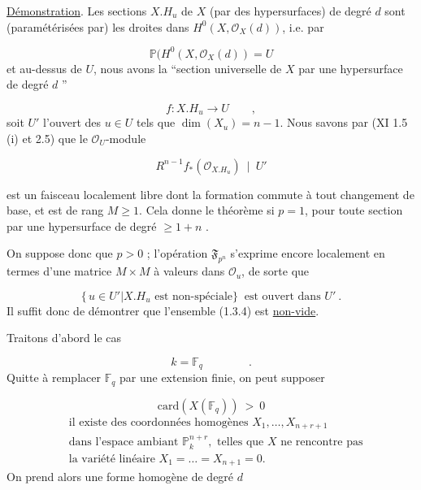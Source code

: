 \underline{Démonstration}. Les sections $X.H_u$ de $X$ (par des hypersurfaces) de degré $d$ sont (paramétérisées par) les droites dans $H^0(X,\mathcal{O}_X(d))$, i.e. par

\begin{equation}\tag{1.3.1}
\mathbb{P}(H^0(X,\mathcal{O}_X(d)) = U
\end{equation}
et au-dessus de $U$, nous avons la ``section universelle de $X$ par une hypersurface de degré $d$ ''

\begin{equation}\tag{1.3.2}
f : X.H_u \longrightarrow U \qquad ,
\end{equation}
soit $U'$ l'ouvert des $u \in U$ tels que $\dim(X_u) = n-1$. Nous savons par (XI 1.5 (i) et 2.5) que le $\mathcal{O}_U$-module

\begin{equation}\tag{1.3.3}
R^{n-1}f_*(\mathcal{O}_{X.H_u}) \ \mid \ U' 
\end{equation}


 est un faisceau localement libre dont la formation commute à tout changement de base, et est de rang $M \geq 1$. Cela donne le théorème si $p = 1$, pour toute section par une hypersurface de degré $\geq 1+n$ .

On suppose donc que $p > 0$ ; l'opération $\mathfrak{F}_{p^n}$ s'exprime encore localement en termes d'une matrice $M \times M$ à valeurs dans $\mathcal{O}_u$, de sorte que

\begin{equation}\tag{1.3.4}
\{ \, u \in U' | X.H_u \text{ est non-spéciale} \} \ \text{ est ouvert dans } U' \ .
\end{equation}
Il suffit donc de démontrer que l'ensemble (1.3.4) est \underline{non-vide}.

Traitons d'abord le cas

\begin{equation}\tag{1.3.5}
k = \mathbb{F}_q \qquad\qquad .
\end{equation}
Quitte à remplacer $\mathbb{F}_q$ par une extension finie, on peut supposer

\begin{equation}\tag{1.3.6}
\mathrm{card}(X(\mathbb{F}_q)) \ > \ 0
\end{equation}
\begin{equation}\tag{1.3.7}
\begin{aligned}
&\text{il existe des coordonnées homogènes } X_1,\dots,X_{n+r+1} \\
&\text{dans l'espace ambiant } \mathbb{P}^{n+r}_k, \text{ telles que } X \text{ ne rencontre pas} \\
&\text{la variété linéaire } X_1=\dots=X_{n+1}=0.
\end{aligned}
\end{equation}
On prend alors une forme homogène de degré $d$

